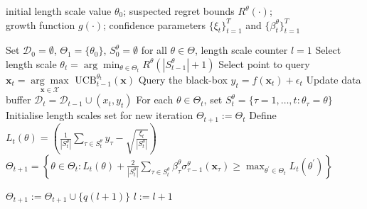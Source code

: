 \documentclass{article}
\theoremstyle{plain}
\theoremstyle{definition}
\theoremstyle{remark}
\theoremstyle{plain}
\begin{document}
\begin{algorithm}
\caption{Length scale Balancing GP-UCB (LB-GP-UCB) }\label{alg:rb_bo}
\begin{algorithmic}[1]
\REQUIRE initial length scale value $\theta_0$; suspected regret bounds $R^\theta(\cdot)$; \\growth function $g(\cdot)$;
confidence parameters $\{\xi_t\}_{t=1}^T$ and
$\{\beta^\theta_t\}_{t=1}^T$ 

\STATE Set $\mathcal{D}_{0} = \emptyset$, $\Theta_1 = \{\theta_0\}$, $S^\theta_0 = \emptyset$ for all $\theta \in \Theta$,  length scale counter $l=1$ \label{alg_line:set_initial_conditions}
\STATE Select length scale  $\theta_t = \arg\min_{\theta \in \Theta_t} R^\theta(|S_{t-1}^{\theta}| + 1)$ \label{alg_line:select_lengthscale}
\STATE Select point to query $\bm{x}_t =  \underset{\bm{x} \in \mathcal{X}}{\arg\max} \textrm{ UCB}_{t-1}^{\theta_t}(\bm{x})$
\STATE Query the black-box $y_t = f(\bm{x}_t) + \epsilon_t$ 
\STATE Update data buffer $\mathcal{D}_t = \mathcal{D}_{t-1} \cup (x_t, y_t)$
\STATE For each $\theta \in \Theta_{t}$, set $S_t^{\theta} = \{\tau  = 1,\dots, t: \theta_{\tau} = \theta\}$
\STATE Initialise length scales set for new iteration $\Theta_{t+1} := \Theta_{t}$
  \label{alg_line:if_add_new_lengthscale}
\STATE Define $L_t(\theta) = \left( \frac{1}{|S_t^{\theta}|} \sum_{\tau \in S_t^{\theta}}y_{\tau} - \sqrt{\frac{\xi_{t}}{|S_{t}^{\theta}|}} \right)$ \label{alg_line:define_L}
\STATE  {}
\STATE $\Theta_{t+1} = \left\{ \theta \in \Theta_t: L_t(\theta) +  \frac{2}{|S_t^{\theta}|} \sum_{\tau \in S_t^\theta} \beta_\tau^\theta \sigma^\theta_{\tau-1}(\bm{x}_\tau)  \ge  \max_{\theta^\prime \in \Theta_{t}} L_t(\theta^\prime) \right\}$
\label{alg_line:eliminate_lengthscale}
\ENDIF

 \label{alg_line:if_add_legnthscale}
    \STATE $\Theta_{t+1} := \Theta_{t+1} \cup \{q(l+1)\}$ 
     \label{alg_line:add_new_lengthscale}
    \STATE $l := l + 1$ \label{alg_line:update_counter}
\ENDIF
\ENDFOR

\end{algorithmic}
\end{algorithm}
\end{document}
